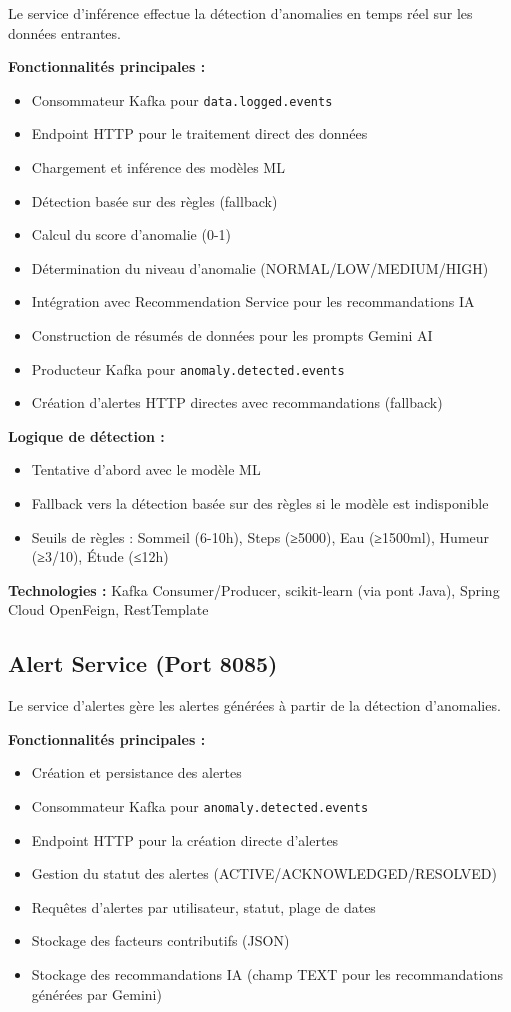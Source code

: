 Le service d'inférence effectue la détection d'anomalies en temps réel sur les données entrantes.

\textbf{Fonctionnalités principales :}
\begin{itemize}
    \item Consommateur Kafka pour \texttt{data.logged.events}
    \item Endpoint HTTP pour le traitement direct des données
    \item Chargement et inférence des modèles ML
    \item Détection basée sur des règles (fallback)
    \item Calcul du score d'anomalie (0-1)
    \item Détermination du niveau d'anomalie (NORMAL/LOW/MEDIUM/HIGH)
    \item Intégration avec Recommendation Service pour les recommandations IA
    \item Construction de résumés de données pour les prompts Gemini AI
    \item Producteur Kafka pour \texttt{anomaly.detected.events}
    \item Création d'alertes HTTP directes avec recommandations (fallback)
\end{itemize}

\textbf{Logique de détection :}
\begin{itemize}
    \item Tentative d'abord avec le modèle ML
    \item Fallback vers la détection basée sur des règles si le modèle est indisponible
    \item Seuils de règles : Sommeil (6-10h), Steps (≥5000), Eau (≥1500ml), Humeur (≥3/10), Étude (≤12h)
\end{itemize}

\textbf{Technologies :} Kafka Consumer/Producer, scikit-learn (via pont Java), Spring Cloud OpenFeign, RestTemplate

\subsection{Alert Service (Port 8085)}

Le service d'alertes gère les alertes générées à partir de la détection d'anomalies.

\textbf{Fonctionnalités principales :}
\begin{itemize}
    \item Création et persistance des alertes
    \item Consommateur Kafka pour \texttt{anomaly.detected.events}
    \item Endpoint HTTP pour la création directe d'alertes
    \item Gestion du statut des alertes (ACTIVE/ACKNOWLEDGED/RESOLVED)
    \item Requêtes d'alertes par utilisateur, statut, plage de dates
    \item Stockage des facteurs contributifs (JSON)
    \item Stockage des recommandations IA (champ TEXT pour les recommandations générées par Gemini)
\end{itemize}

